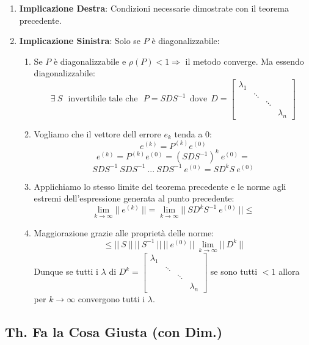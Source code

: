 \documentclass{article}
\begin{document}
\begin{enumerate}
    \item \textbf{Implicazione Destra}: Condizioni necessarie dimostrate con il teorema precedente.
    \item \textbf{Implicazione Sinistra}: Solo se $P$ è diagonalizzabile:
    \begin{enumerate}
        \item Se $P$ è diagonalizzabile e $\rho(P) < 1 \Rightarrow$ il metodo converge. Ma essendo diagonalizzabile:
        \[ \exists \: S \:\:\: \text{invertibile tale che} \:\:\: P = SDS^{-1} \:\: \text{dove} \:\: D = \begin{bmatrix}
            \lambda_{1} & & & \\
            & \ddots & & \\
            & & \ddots & \\
            & & & \lambda_{n}
        \end{bmatrix} \]
        \newpage
        \item Vogliamo che il vettore dell errore $e_{k}$ tenda a $0$:
        \[ \boxed{e^{(k)} = P^{(k)}e^{(0)}} \]
        \[ e^{(k)} = P^{(k)}e^{(0)} = (SDS^{-1})^{k} \: e^{(0)} = \]
        \[ SDS^{-1}\: SDS^{-1} \: ... \: SDS^{-1} \: e^{(0)} = SD^{k}S\:e^{(0)} \]
        \item Applichiamo lo stesso limite del teorema precedente e le norme agli estremi dell'espressione generata al punto precedente:
        \[ \lim_{k \rightarrow \infty} ||\:e^{(k)}\:|| = \lim_{k \rightarrow \infty} ||\:SD^{k}S^{-1}\:e^{(0)}\:|| \leq \]
        \item Maggiorazione grazie alle proprietà delle norme:
        \[ \leq ||\:S\:||\:||\:S^{-1}\:||\:||\:e^{(0)}\:||\: \lim_{k \rightarrow \infty} ||\:D^{k}\:|| \]
        Dunque se tutti i $\lambda$ di $D^{k} = \begin{bmatrix}
            \lambda_{1} & & & \\
            & \ddots & & \\
            & & \ddots & \\
            & & & \lambda_{n}
        \end{bmatrix} 
        $ se sono tutti $< 1$ allora per $k \rightarrow \infty$ convergono tutti i $\lambda$.
    \end{enumerate}
\end{enumerate}

\subsection{Th. Fa la Cosa Giusta (con Dim.)}
\end{document}
